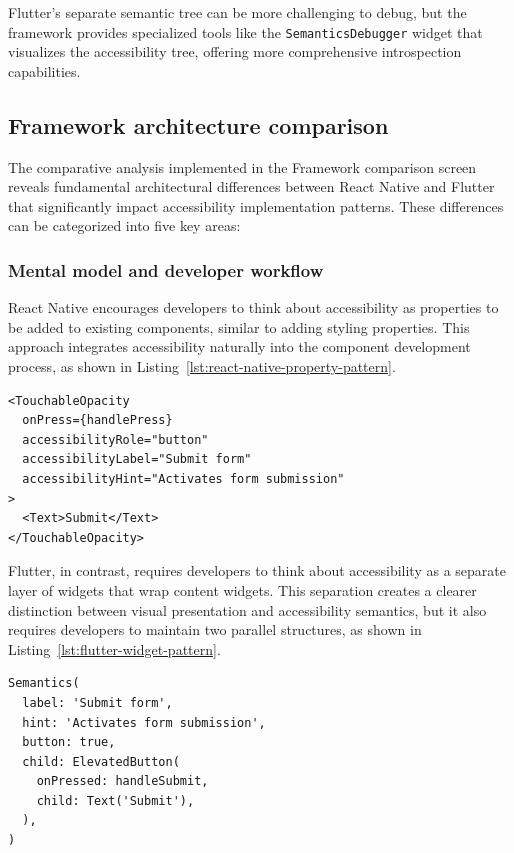 Flutter's separate semantic tree can be more challenging to debug, but the framework provides specialized tools like the \texttt{SemanticsDebugger} widget that visualizes the accessibility tree, offering more comprehensive introspection capabilities.
\subsection{Framework architecture comparison}

The comparative analysis implemented in the Framework comparison screen reveals fundamental architectural differences between React Native and Flutter that significantly impact accessibility implementation patterns. These differences can be categorized into five key areas:

\subsubsection{Mental model and developer workflow}

React Native encourages developers to think about accessibility as properties to be added to existing components, similar to adding styling properties. This approach integrates accessibility naturally into the component development process, as shown in Listing~\ref{lst:react-native-property-pattern}.

\begin{lstlisting}[style=ReactNativeStyle, caption=Property-based accessibility pattern in React Native, label=lst:react-native-property-pattern]
<TouchableOpacity
  onPress={handlePress}
  accessibilityRole="button"
  accessibilityLabel="Submit form"
  accessibilityHint="Activates form submission"
>
  <Text>Submit</Text>
</TouchableOpacity>
\end{lstlisting}

\FloatBarrier

Flutter, in contrast, requires developers to think about accessibility as a separate layer of widgets that wrap content widgets. This separation creates a clearer distinction between visual presentation and accessibility semantics, but it also requires developers to maintain two parallel structures, as shown in Listing~\ref{lst:flutter-widget-pattern}.

\begin{lstlisting}[style=DartStyle, caption=Widget-based accessibility pattern in Flutter, label=lst:flutter-widget-pattern]
Semantics(
  label: 'Submit form',
  hint: 'Activates form submission',
  button: true,
  child: ElevatedButton(
    onPressed: handleSubmit,
    child: Text('Submit'),
  ),
)
\end{lstlisting}

